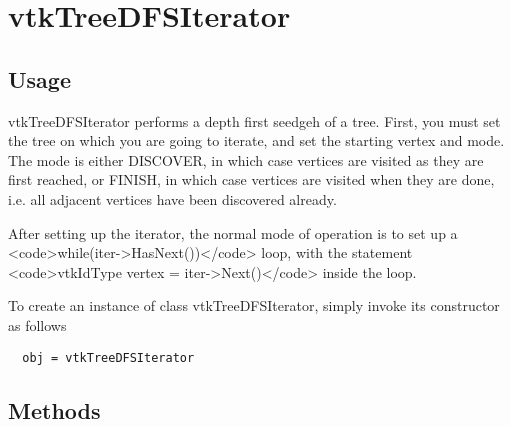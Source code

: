 \section{vtkTreeDFSIterator}

\subsection{Usage}

 vtkTreeDFSIterator performs a depth first seedgeh of a tree.  First,
 you must set the tree on which you are going to iterate, and set
 the starting vertex and mode.  The mode is either DISCOVER, in which
 case vertices are visited as they are first reached, or FINISH, in which
 case vertices are visited when they are done, i.e. all adjacent vertices
 have been discovered already.

 After setting up the iterator, the normal mode of operation is to
 set up a <code>while(iter->HasNext())</code> loop, with the statement
 <code>vtkIdType vertex = iter->Next()</code> inside the loop.

To create an instance of class vtkTreeDFSIterator, simply
invoke its constructor as follows
\begin{verbatim}
  obj = vtkTreeDFSIterator
\end{verbatim}
\subsection{Methods}

